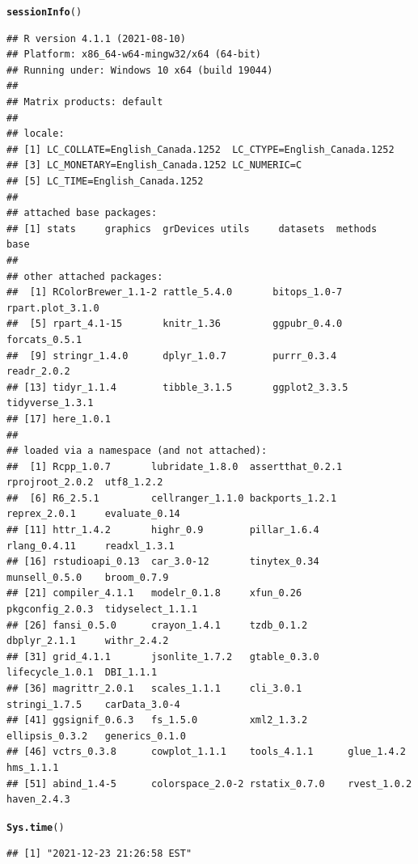 \documentclass{article}\usepackage[]{graphicx}\usepackage[]{color}
\makeatletter
\newcommand{\hlstd}[1]{\textcolor[rgb]{0.345,0.345,0.345}{#1}}%
\newcommand{\hlkwd}[1]{\textcolor[rgb]{0.737,0.353,0.396}{\textbf{#1}}}%
\newenvironment{kframe}{%
 \def\at@end@of@kframe{}%
 \ifinner\ifhmode%
  \def\at@end@of@kframe{\end{minipage}}%
  \begin{minipage}{\columnwidth}%
 \fi\fi%
 \def\FrameCommand##1{\hskip\@totalleftmargin \hskip-\fboxsep
 \colorbox{shadecolor}{##1}\hskip-\fboxsep
     \hskip-\linewidth \hskip-\@totalleftmargin \hskip\columnwidth}%
 \MakeFramed {\advance\hsize-\width
   \@totalleftmargin\z@ \linewidth\hsize
   \@setminipage}}%
 {\par\unskip\endMakeFramed%
 \at@end@of@kframe}
\newenvironment{knitrout}{}{} %
\makeatother
\begin{document}
\begin{knitrout}
\color{fgcolor}\begin{kframe}
\begin{alltt}
\hlkwd{sessionInfo}\hlstd{()}
\end{alltt}
\begin{verbatim}
## R version 4.1.1 (2021-08-10)
## Platform: x86_64-w64-mingw32/x64 (64-bit)
## Running under: Windows 10 x64 (build 19044)
## 
## Matrix products: default
## 
## locale:
## [1] LC_COLLATE=English_Canada.1252  LC_CTYPE=English_Canada.1252   
## [3] LC_MONETARY=English_Canada.1252 LC_NUMERIC=C                   
## [5] LC_TIME=English_Canada.1252    
## 
## attached base packages:
## [1] stats     graphics  grDevices utils     datasets  methods   base     
## 
## other attached packages:
##  [1] RColorBrewer_1.1-2 rattle_5.4.0       bitops_1.0-7       rpart.plot_3.1.0  
##  [5] rpart_4.1-15       knitr_1.36         ggpubr_0.4.0       forcats_0.5.1     
##  [9] stringr_1.4.0      dplyr_1.0.7        purrr_0.3.4        readr_2.0.2       
## [13] tidyr_1.1.4        tibble_3.1.5       ggplot2_3.3.5      tidyverse_1.3.1   
## [17] here_1.0.1        
## 
## loaded via a namespace (and not attached):
##  [1] Rcpp_1.0.7       lubridate_1.8.0  assertthat_0.2.1 rprojroot_2.0.2  utf8_1.2.2      
##  [6] R6_2.5.1         cellranger_1.1.0 backports_1.2.1  reprex_2.0.1     evaluate_0.14   
## [11] httr_1.4.2       highr_0.9        pillar_1.6.4     rlang_0.4.11     readxl_1.3.1    
## [16] rstudioapi_0.13  car_3.0-12       tinytex_0.34     munsell_0.5.0    broom_0.7.9     
## [21] compiler_4.1.1   modelr_0.1.8     xfun_0.26        pkgconfig_2.0.3  tidyselect_1.1.1
## [26] fansi_0.5.0      crayon_1.4.1     tzdb_0.1.2       dbplyr_2.1.1     withr_2.4.2     
## [31] grid_4.1.1       jsonlite_1.7.2   gtable_0.3.0     lifecycle_1.0.1  DBI_1.1.1       
## [36] magrittr_2.0.1   scales_1.1.1     cli_3.0.1        stringi_1.7.5    carData_3.0-4   
## [41] ggsignif_0.6.3   fs_1.5.0         xml2_1.3.2       ellipsis_0.3.2   generics_0.1.0  
## [46] vctrs_0.3.8      cowplot_1.1.1    tools_4.1.1      glue_1.4.2       hms_1.1.1       
## [51] abind_1.4-5      colorspace_2.0-2 rstatix_0.7.0    rvest_1.0.2      haven_2.4.3
\end{verbatim}
\begin{alltt}
\hlkwd{Sys.time}\hlstd{()}
\end{alltt}
\begin{verbatim}
## [1] "2021-12-23 21:26:58 EST"
\end{verbatim}
\end{kframe}
\end{knitrout}
\end{document}
